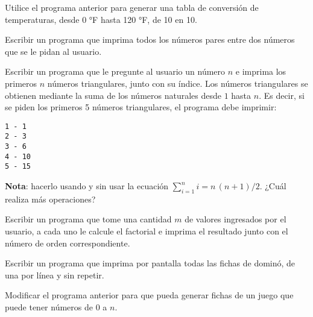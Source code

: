 \begin{ejercicio}
Utilice el programa anterior para generar una tabla de conversión de
temperaturas, desde 0 °F hasta 120 °F, de 10 en 10.
\end{ejercicio}

\begin{ejercicio}
Escribir un programa que imprima todos los números pares entre dos números
que se le pidan al usuario.
\end{ejercicio}

\begin{ejercicio}
Escribir un programa que le pregunte al usuario un número $n$
e imprima los primeros $n$ números triangulares, junto con su
índice. Los números triangulares se obtienen mediante la suma de los números
naturales desde $1$ hasta $n$.  Es decir, si se piden los primeros 5
números triangulares, el programa debe imprimir:

\begin{verbatim}
1 - 1
2 - 3
3 - 6
4 - 10
5 - 15
\end{verbatim}

{\bf Nota}: hacerlo usando y sin usar la ecuación $\sum_{i=1}^n i = n\,(n+1)/2$.
¿Cuál realiza más operaciones?
\end{ejercicio}

\begin{ejercicio}
Escribir un programa que tome una cantidad $m$ de valores ingresados
por el usuario, a cada uno le calcule el factorial e imprima el resultado
junto con el número de orden correspondiente.
\end{ejercicio}

\begin{ejercicio}
Escribir un programa que imprima por pantalla todas las fichas de dominó, de
una por línea y sin repetir.
\end{ejercicio}

\begin{ejercicio}
Modificar el programa anterior para que pueda generar fichas de un juego
que puede tener números de 0 a $n$.
\end{ejercicio}
